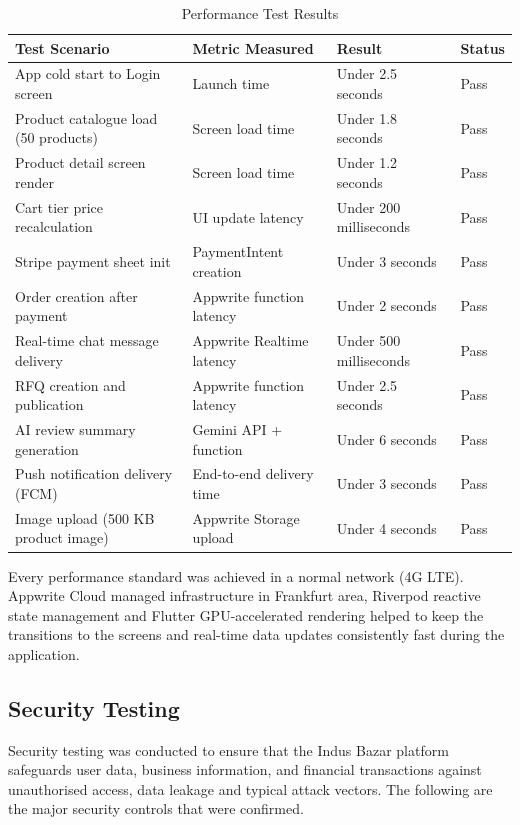 \begin{table}[H]
\centering
\caption{Performance Test Results}
\label{tab:performance_testing}
\renewcommand{\arraystretch}{1.3}
\small
\begin{tabular}{|p{4cm}|p{3.5cm}|p{3.5cm}|p{2.5cm}|}
\hline
\rowcolor{lightgray}
\textbf{Test Scenario} & \textbf{Metric Measured} & \textbf{Result} & \textbf{Status} \\
\hline
App cold start to Login screen & Launch time & Under 2.5 seconds & Pass \\
\hline
Product catalogue load (50 products) & Screen load time & Under 1.8 seconds & Pass \\
\hline
Product detail screen render & Screen load time & Under 1.2 seconds & Pass \\
\hline
Cart tier price recalculation & UI update latency & Under 200 milliseconds & Pass \\
\hline
Stripe payment sheet init & PaymentIntent creation & Under 3 seconds & Pass \\
\hline
Order creation after payment & Appwrite function latency & Under 2 seconds & Pass \\
\hline
Real-time chat message delivery & Appwrite Realtime latency & Under 500 milliseconds & Pass \\
\hline
RFQ creation and publication & Appwrite function latency & Under 2.5 seconds & Pass \\
\hline
AI review summary generation & Gemini API + function & Under 6 seconds & Pass \\
\hline
Push notification delivery (FCM) & End-to-end delivery time & Under 3 seconds & Pass \\
\hline
Image upload (500 KB product image) & Appwrite Storage upload & Under 4 seconds & Pass \\
\hline
\end{tabular}
\end{table}
Every performance standard was achieved in a normal network (4G LTE). Appwrite Cloud managed infrastructure in Frankfurt area, Riverpod reactive state management and Flutter GPU-accelerated rendering helped to keep the transitions to the screens and real-time data updates consistently fast during the application.
\subsection{Security Testing}
Security testing was conducted to ensure that the Indus Bazar platform safeguards user data, business information, and financial transactions against unauthorised access, data leakage and typical attack vectors. The following are the major security controls that were confirmed.

